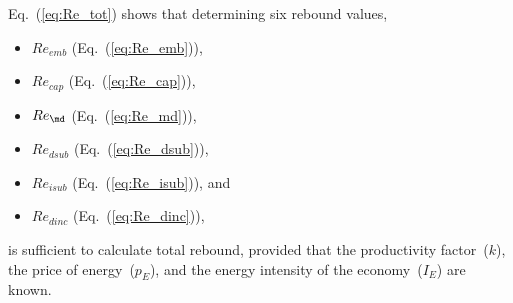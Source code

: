 Eq.~(\ref{eq:Re_tot}) shows that determining six rebound values,
%
\begin{itemize}

  \item $Re_{emb}$ (Eq.~(\ref{eq:Re_emb})), 

  \item $Re_{cap}$ (Eq.~(\ref{eq:Re_cap})), 
  
  \item $Re_{\md}$ (Eq.~(\ref{eq:Re_md})),
  
  \item $Re_{dsub}$ (Eq.~(\ref{eq:Re_dsub})),
  
  \item $Re_{isub}$ (Eq.~(\ref{eq:Re_isub})), and
  
  \item $Re_{dinc}$ (Eq.~(\ref{eq:Re_dinc})),

\end{itemize}
%
is sufficient to calculate total rebound, 
provided that 
the productivity factor~($k$),
the price of energy~($p_E$), and
the energy intensity of the economy~($I_E$) 
are known.
